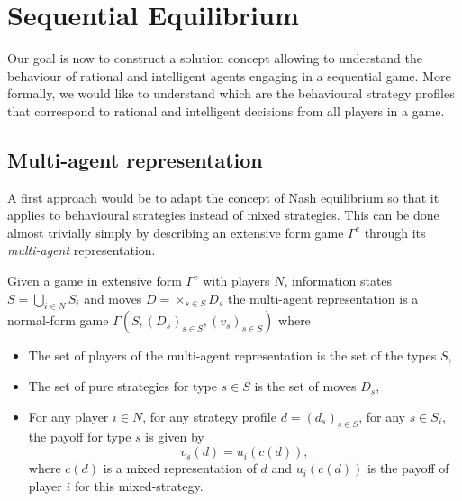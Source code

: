 \section{Sequential Equilibrium}
\label{ch4:sec:Eq}

Our goal is now to construct a solution concept allowing to understand the behaviour of rational and intelligent agents engaging in a sequential game. More formally, we would like to understand which are the behavioural strategy profiles that correspond to rational and intelligent decisions from all players in a game.

\subsection{Multi-agent representation}

A first approach would be to adapt the concept of Nash equilibrium so that it applies to behavioural strategies instead of mixed strategies. This can be done almost trivially simply by describing an extensive form game $\Gamma^e$ through its \emph{multi-agent} representation.
\begin{definition}
Given a game in extensive form $\Gamma^e$ with players $N$, information states $S = \bigcup_{i \in N} S_i$ and moves $D = \times_{s \in S} D_s$ the multi-agent representation is a normal-form game
$\Gamma(S,(D_s)_{s \in S}, (v_s)_{s \in S})$ where
\begin{itemize}
\item The set of players of the multi-agent representation is the set of the types $S$, 
\item The set of pure strategies for type $s \in S$ is the set of moves $D_s$, 
\item For any player $i \in N$, for  any strategy profile $d = (d_s)_{s \in S}$, for any $s \in S_i$, 
the payoff for type $s$ is given by
$$ v_s(d) = u_i(c(d)),$$
where $c(d)$ is a mixed representation of $d$ and $u_i(c(d))$ is the payoff of player $i$ for this mixed-strategy. 
\end{itemize} 
\end{definition}
